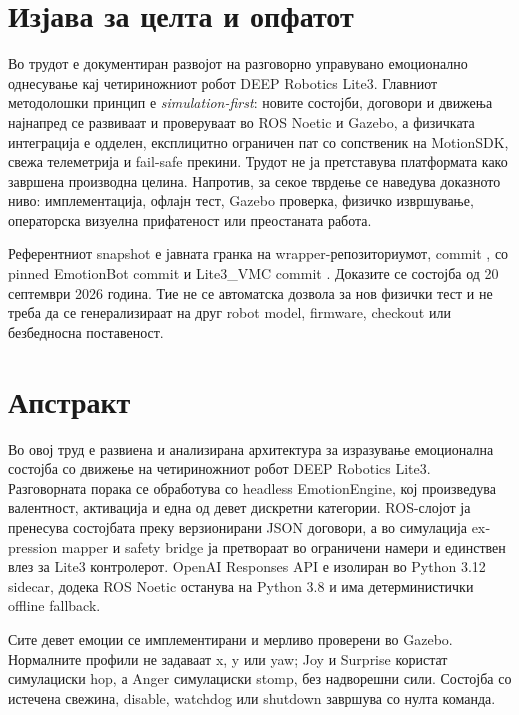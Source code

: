 \chapter*{Изјава за целта и опфатот}

Во трудот е документиран развојот на разговорно управувано емоционално
однесување кај четириножниот робот DEEP Robotics Lite3. Главниот методолошки
принцип е \emph{simulation-first}: новите состојби, договори и движења најнапред
се развиваат и проверуваат во ROS Noetic и Gazebo, а физичката интеграција е
одделен, експлицитно ограничен пат со сопственик на MotionSDK, свежа телеметрија
и fail-safe прекини. Трудот не ја претставува платформата како завршена
производна целина. Напротив, за секое тврдење се наведува доказното ниво:
имплементација, офлајн тест, Gazebo проверка, физичко извршување, операторска
визуелна прифатеност или преостаната работа.

Референтниот snapshot е јавната гранка
 на wrapper-репозиториумот, commit
, со pinned EmotionBot commit
 и Lite3\_VMC commit
. Доказите се состојба од
20 септември 2026 година. Тие не се автоматска дозвола за нов физички тест и
не треба да се генерализираат на друг robot model, firmware, checkout или
безбедносна поставеност.

\chapter*{Апстракт}

Во овој труд е развиена и анализирана архитектура за изразување емоционална
состојба со движење на четириножниот робот DEEP Robotics Lite3. Разговорната
порака се обработува со headless \textenglish{EmotionEngine}, кој произведува
валентност, активација и една од девет дискретни категории. ROS-слојот ја
пренесува состојбата преку верзионирани JSON договори, а во симулација
\textenglish{expression mapper} и \textenglish{safety bridge} ја претвораат во
ограничени  намери и единствен
 влез за Lite3 контролерот. OpenAI Responses API е
изолиран во Python 3.12 sidecar, додека ROS Noetic останува на Python 3.8 и
има детерминистички offline fallback.

Сите девет емоции се имплементирани и мерливо проверени во Gazebo. Нормалните
профили не задаваат x, y или yaw; Joy и Surprise користат симулациски hop, а
Anger симулациски stomp, без надворешни сили. Состојба со истечена свежина,
disable, watchdog или shutdown завршува со нулта команда.

